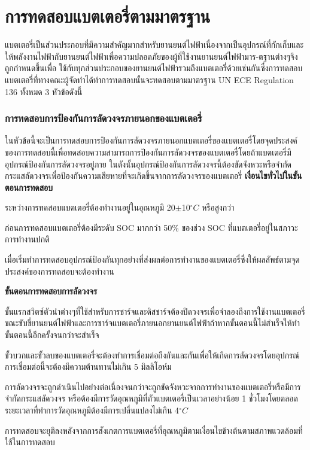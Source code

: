 \chapter{การทดสอบแบตเตอรี่ตามมาตรฐาน}
แบตเตอรี่เป็นส่วนประกอบที่มีความสำคัญมากสำหรับยานยนต์ไฟฟ้าเนื่องจากเป็นอุปกรณ์ที่กักเก็บและให้พลังงานไฟฟ้ากับยานยนต์ไฟฟ้าเพื่อความปลอดภัยของผู้ที่ใช้งานยานยนต์ไฟฟ้ามาร-ตฐานต่างๆจึงถูกกำหนดขึ้นเพื่อ
ใช้กับทุกส่วนประกอบของยานยนต์ไฟฟ้ารวมถึงแบตเตอรี่ด้วยเช่นกันซึ่งการทดสอบแบตเตอรี่ที่ทางคณะผู้จัดทำได้ทำการทดสอบนั้นจะทดสอบตามมาตรฐาน UN ECE Regulation 136 ทั้งหมด 3 หัวข้อดังนี้
\subsection{การทดสอบการป้องกันการลัดวงจรภายนอกของแบตเตอรี่}
ในหัวข้อนี้จะเป็นการทดสอบการป้องกันการลัดวงจรภายนอกแบตเตอรี่ของแบตเตอรี่โดยจุดประสงค์ของการทดสอบนี้เพื่อทดสอบความสามารถการป้องกันการลัดวงจรของแบตเตอรี่โดยถ้าแบตเตอรี่มีอุปกรณ์ป้องกันการลัดวงจรอยู่ภาย
ในดังนั้นอุปกรณ์ป้องกันการลัดวงจรนี้ต้องขัดจังหวะหรือจำกัดกระแสลัดวงจรเพื่อป้องกันความเสียหายที่จะเกิดขึ้นจากการลัดวงจรของแบตเตอรี่
\newline
\newline
\textbf{เงื่อนไขทั่วไปในขั้นตอนการทดสอบ}
\begin{itemize}
{\item ระหว่างการทดสอบแบตเตอรี่ต้องทำงานอยู่ในอุณหภูมิ 20$\pm$10$^{\circ}C$ หรือสูงกว่า}
{\item ก่อนการทดสอบแบตเตอรี่ต้องมีระดับ SOC มากกว่า 50\% ของช่วง SOC ที่แบตเตอรี่อยู่ในสภาวะการทำงานปกติ}
{\item เมื่อเริ่มทำการทดสอบอุปกรณ์ป้องกันทุกอย่างที่ส่งผลต่อการทำงานของแบตเตอรี่ซึ่งให้ผลลัพธ์ตามจุดประสงค์ของการทดสอบจะต้องทำงาน}
\end{itemize}
\textbf{ขั้นตอนการทดสอบการลัดวงจร}
\begin{itemize}
{\item ขั้นแรกสวิตซ์ตัวนำต่างๆที่ใช้สำหรับการชาร์จและดิสชาร์จต้องปิดวงจรเพื่อจำลองถึงการใช้งานแบตเตอรี่ขณะขับขี่ยานยนต์ไฟฟ้าและการชาร์จแบตเตอรี่ภายนอกยานยนต์ไฟฟ้าถ้าหากขั้นตอนนี้ไม่สำเร็จให้ทำขั้นตอนนี้อีกครั้งจนกว่าจะสำเร็จ}
{\item ขั้วบวกและขั้วลบของแบตเตอรี่จะต้องทำการเชื่อมต่อถึงกันและกันเพื่อให้เกิดการลัดวงจรโดยอุปกรณ์การเชื่อมต่อนี้จะต้องมีความต้านทานไม่เกิน 5 มิลลิโอห์ม}
{\item การลัดวงจรจะถูกดำเนินไปอย่างต่อเนื่องจนกว่าจะถูกขัดจังหวะจากการทำงานของแบตเตอรี่หรือมีการจำกัดกระแสลัดวงจร หรือต้องมีการวัดอุณหภูมิที่ตัวแบตเตอรี่เป็นเวลาอย่างน้อย 1 ชั่วโมงโดยตลอดระยะเวลาที่ทำการวัดอุณหภูมิต้องมีการเปลี่นแปลงไม่เกิน 4$^{\circ}C$}
{\item การทดสอบจะยุติลงหลังจากการสังเกตการแบตเตอรี่ที่อุณหภูมิตามเงื่อนไขข้างต้นตามสภาพแวดล้อมที่ใช้ในการทดสอบ}
\end{itemize}
